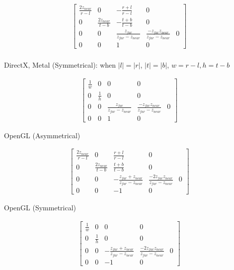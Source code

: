     \begin{align*}
      \begin{bmatrix}
        \frac{2 z_{near}}{r - l} & 0 & -\frac{r + l}{r - l} & 0 \\
        0 & \frac{2 z_{near}}{t - b} & -\frac{t + b}{t - b} & 0 \\
        0 & 0 & \frac{z_{far}}{z_{far} - z_{near}} & \frac{- z_{far} z_{near}}{z_{far} - z_{near}} & 0 \\
        0 & 0 & 1 & 0
      \end{bmatrix} \\
    \end{align*}

    DirectX, Metal (Symmetrical): when $ \left| l \right| = \left| r \right| $,
    $ \left| t \right| = \left| b \right| $, $ w = r - l, h = t - b $

    \begin{align*}
      \begin{bmatrix}
        \frac{1}{w} & 0 & 0 & 0 \\
        0 & \frac{1}{h} & 0 & 0 \\
        0 & 0 & \frac{z_{far}}{z_{far} - z_{near}} & \frac{- z_{far} z_{near}}{z_{far} - z_{near}} & 0 \\
        0 & 0 & 1 & 0
      \end{bmatrix}
    \end{align*}

    OpenGL (Asymmetrical)

    \begin{align*}
      \begin{bmatrix}
        \frac{2 z_{near}}{r - l} & 0 & \frac{r + l}{r - l} & 0 \\
        0 & \frac{2 z_{near}}{t - b} & \frac{t + b}{t - b} & 0 \\
        0 & 0 & - \frac{z_{far} + z_{near}}{z_{far} - z_{near}} & \frac{- 2 z_{far} z_{near}}{z_{far} - z_{near}} & 0 \\
        0 & 0 & -1 & 0
      \end{bmatrix}
    \end{align*}

    OpenGL (Symmetrical)

    \begin{align*}
      \begin{bmatrix}
        \frac{1}{w} & 0 & 0 & 0 \\
        0 & \frac{1}{h} & 0 & 0 \\
        0 & 0 & - \frac{z_{far} + z_{near}}{z_{far} - z_{near}} & \frac{- 2 z_{far} z_{near}}{z_{far} - z_{near}} & 0 \\
        0 & 0 & -1 & 0
      \end{bmatrix}
    \end{align*}

